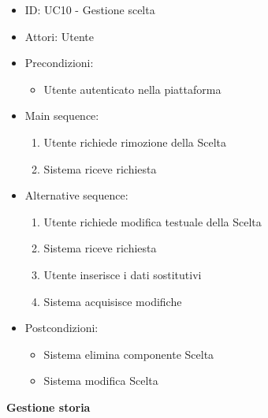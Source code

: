 \documentclass{article}
\begin{document}
\begin{itemize}[label = { }]
    \itemsep0px
    \item ID: UC10 - Gestione scelta
    \item Attori: Utente
    \item Precondizioni: 
        \begin{itemize}[label = {-}]
            \item Utente autenticato nella piattaforma
        \end{itemize}
    \item Main sequence: 
        \begin{enumerate}
            \item Utente richiede rimozione della Scelta
            \item Sistema riceve richiesta
        \end{enumerate}
    \item Alternative sequence:
        \begin{enumerate}
            \item Utente richiede modifica testuale della Scelta
            \item Sistema riceve richiesta
            \item Utente inserisce i dati sostitutivi
            \item Sistema acquisisce modifiche
        \end{enumerate}
    \item Postcondizioni: 
        \begin{itemize}[label = {-}]
            \item Sistema elimina componente Scelta
            \item Sistema modifica Scelta
        \end{itemize}
\end{itemize}
\textbf{Gestione storia}
\end{document}
